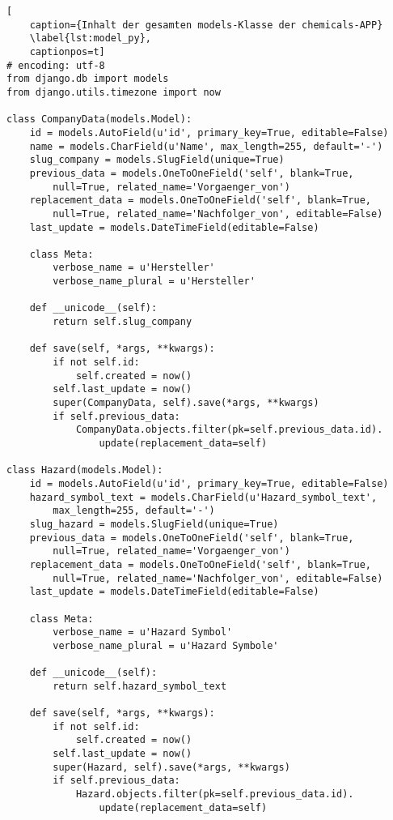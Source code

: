 \begin{lstlisting}[
    caption={Inhalt der gesamten models-Klasse der chemicals-APP}
    \label{lst:model_py},
    captionpos=t]
# encoding: utf-8
from django.db import models
from django.utils.timezone import now

class CompanyData(models.Model):
    id = models.AutoField(u'id', primary_key=True, editable=False)
    name = models.CharField(u'Name', max_length=255, default='-')
    slug_company = models.SlugField(unique=True)
    previous_data = models.OneToOneField('self', blank=True, 
        null=True, related_name='Vorgaenger_von')
    replacement_data = models.OneToOneField('self', blank=True, 
        null=True, related_name='Nachfolger_von', editable=False)
    last_update = models.DateTimeField(editable=False)

    class Meta:
        verbose_name = u'Hersteller'
        verbose_name_plural = u'Hersteller'

    def __unicode__(self):
        return self.slug_company

    def save(self, *args, **kwargs):
        if not self.id:
            self.created = now()
        self.last_update = now()
        super(CompanyData, self).save(*args, **kwargs)
        if self.previous_data:
            CompanyData.objects.filter(pk=self.previous_data.id).
                update(replacement_data=self)

class Hazard(models.Model):
    id = models.AutoField(u'id', primary_key=True, editable=False)
    hazard_symbol_text = models.CharField(u'Hazard_symbol_text', 
        max_length=255, default='-')    
    slug_hazard = models.SlugField(unique=True)
    previous_data = models.OneToOneField('self', blank=True, 
        null=True, related_name='Vorgaenger_von')
    replacement_data = models.OneToOneField('self', blank=True, 
        null=True, related_name='Nachfolger_von', editable=False)
    last_update = models.DateTimeField(editable=False)

    class Meta:
        verbose_name = u'Hazard Symbol'
        verbose_name_plural = u'Hazard Symbole'

    def __unicode__(self):
        return self.hazard_symbol_text

    def save(self, *args, **kwargs):
        if not self.id:
            self.created = now()
        self.last_update = now()
        super(Hazard, self).save(*args, **kwargs)
        if self.previous_data:
            Hazard.objects.filter(pk=self.previous_data.id).
                update(replacement_data=self)


\end{lstlisting}
